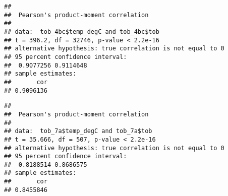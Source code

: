 \documentclass[
]{article}
\newenvironment{Shaded}{\begin{snugshade}}{\end{snugshade}}
\newcommand{\CommentTok}[1]{\textcolor[rgb]{0.56,0.35,0.01}{\textit{#1}}}
\newcommand{\FunctionTok}[1]{\textcolor[rgb]{0.00,0.00,0.00}{#1}}
\newcommand{\NormalTok}[1]{#1}
\newcommand{\OtherTok}[1]{\textcolor[rgb]{0.56,0.35,0.01}{#1}}
\newcommand{\SpecialCharTok}[1]{\textcolor[rgb]{0.00,0.00,0.00}{#1}}
\newcommand{\StringTok}[1]{\textcolor[rgb]{0.31,0.60,0.02}{#1}}
\begin{document}
\begin{Shaded}
\end{Shaded}

\begin{verbatim}
## 
##  Pearson's product-moment correlation
## 
## data:  tob_4bc$temp_degC and tob_4bc$tob
## t = 396.2, df = 32746, p-value < 2.2e-16
## alternative hypothesis: true correlation is not equal to 0
## 95 percent confidence interval:
##  0.9077256 0.9114648
## sample estimates:
##       cor 
## 0.9096136
\end{verbatim}

\begin{Shaded}
\end{Shaded}

\begin{verbatim}
## 
##  Pearson's product-moment correlation
## 
## data:  tob_7a$temp_degC and tob_7a$tob
## t = 35.666, df = 507, p-value < 2.2e-16
## alternative hypothesis: true correlation is not equal to 0
## 95 percent confidence interval:
##  0.8188514 0.8686575
## sample estimates:
##       cor 
## 0.8455846
\end{verbatim}

\begin{Shaded}
\end{Shaded}
\end{document}
